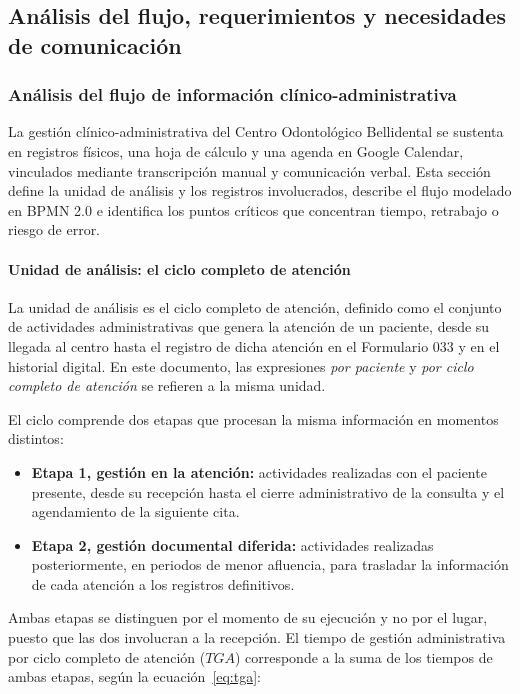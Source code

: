 \subsection{Análisis del flujo, requerimientos y necesidades de comunicación}

\subsubsection{Análisis del flujo de información clínico-administrativa}

La gestión clínico-administrativa del Centro Odontológico Bellidental se sustenta en registros físicos, una hoja de cálculo y una agenda en Google Calendar, vinculados mediante transcripción manual y comunicación verbal. Esta sección define la unidad de análisis y los registros involucrados, describe el flujo modelado en BPMN 2.0 e identifica los puntos críticos que concentran tiempo, retrabajo o riesgo de error.

\paragraph{Unidad de análisis: el ciclo completo de atención}

La unidad de análisis es el ciclo completo de atención, definido como el conjunto de actividades administrativas que genera la atención de un paciente, desde su llegada al centro hasta el registro de dicha atención en el Formulario 033 y en el historial digital. 
En este documento, las expresiones \emph{por paciente} y \emph{por ciclo completo de atención} se refieren a la misma unidad.

El ciclo comprende dos etapas que procesan la misma información en momentos distintos:

\begin{itemize}[leftmargin=*]
    \item \textbf{Etapa 1, gestión en la atención:} actividades realizadas con el paciente presente, desde su recepción hasta el cierre administrativo de la consulta y el agendamiento de la siguiente cita.
    \item \textbf{Etapa 2, gestión documental diferida:} actividades realizadas posteriormente, en periodos de menor afluencia, para trasladar la información de cada atención a los registros definitivos.
\end{itemize}

Ambas etapas se distinguen por el momento de su ejecución y no por el lugar, puesto que las dos involucran a la recepción. El tiempo de gestión administrativa por ciclo completo de atención ($TGA$) corresponde a la suma de los tiempos de ambas etapas, según la ecuación~\eqref{eq:tga}:

